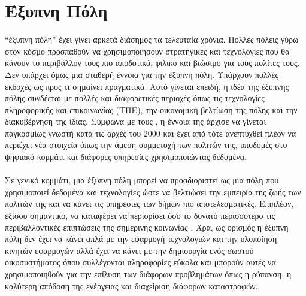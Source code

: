 \section{Έξυπνη Πόλη}

 “έξυπνη πόλη” έχει γίνει αρκετά διάσημος τα τελευταία χρόνια. Πολλές πόλεις γύρω στον κόσμο προσπαθούν να χρησιμοποιήσουν στρατηγικές και τεχνολογίες που θα κάνουν το περιβάλλον τους πιο αποδοτικό, φιλικό και βιώσιμο για τους πολίτες τους. Δεν υπάρχει όμως μια σταθερή έννοια για την έξυπνη πόλη. Υπάρχουν πολλές εκδοχές ως προς τι σημαίνει πραγματικά. Αυτό γίνεται επειδή, η ιδέα της έξυπνης πόλης συνδέεται με πολλές και διαφορετικές περιοχές όπως τις τεχνολογίες πληροφορικής και επικοινωνίας (ΤΠΕ), την οικονομική βελτίωση της πόλης και την διακυβέρνηση της ίδιας. Σύμφωνα με τους \textcite{macadar2016smart}, η έννοια της άρχισε να γίνεται παγκοσμίως γνωστή κατά τις αρχές του 2000 και έχει από τότε ανεπτυχθεί πλέον να περιέχει νέα στοιχεία όπως την άμεση συμμετοχή των πολιτών της, υποδομές στο ψηφιακό κομμάτι και διάφορες υπηρεσίες χρησιμοποιώντας δεδομένα.
\\
\\
Σε γενικό κομμάτι, μια έξυπνη πόλη μπορεί να προσδιοριστεί ως μια πόλη που χρησιμοποιεί δεδομένα και τεχνολογίες ώστε να βελτιώσει την εμπειρία της ζωής των πολιτών της και να κάνει τις υπηρεσίες των δήμων πιο αποτελεσματικές. Επιπλέον, εξίσου σημαντικό, να καταφέρει να περιορίσει όσο το δυνατό περισσότερο τις περιβαλλοντικές επιπτώσεις της σημερινής κοινωνίας \parencite{macadar2016smart}. Άρα, ως ορισμός η έξυπνη πόλη δεν έχει να κάνει απλά με την εφαρμογή τεχνολογιών και την υλοποίηση κινητών εφαρμογών αλλά έχει να κάνει με την δημιουργία ενός σωστού οικοσυστήματος όπου συλλέγονται πληροφορίες εύκολα και μπορούν αυτές να χρησιμοποιηθούν για την επίλυση των διάφορων προβλημάτων όπως η ρύπανση, η καλύτερη απόδοση της ενέργειας και διαχείριση διάφορων καταστροφών.

